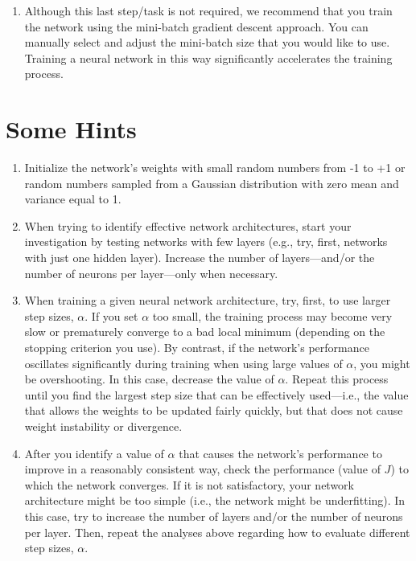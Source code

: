 \documentclass[letterpaper]{article}
\begin{document}
\begin{enumerate}
    \item Although this last step/task is not required, we recommend that you train the network using the mini-batch gradient descent approach. You can manually select and adjust the mini-batch size that you would like to use. Training a neural network in this way significantly accelerates the training process.
    
\end{enumerate}

\section{Some Hints}

\begin{enumerate}
    \item Initialize the network's weights with small random numbers from -1 to +1 or random numbers sampled from a Gaussian distribution with zero mean and variance equal to 1.
    \item When trying to identify effective network architectures, start your investigation by testing networks with few layers (e.g., try, first, networks with just one hidden layer). Increase the number of layers---and/or the number of neurons per layer---only when necessary.
    \item When training a given neural network architecture, try, first, to use larger step sizes, $\alpha$. If you set $\alpha$ too small, the training process may become very slow or prematurely converge to a bad local minimum (depending on the stopping criterion you use). By contrast, if the network's performance oscillates significantly during training when using large values of $\alpha$, you might be overshooting. In this case, decrease the value of $\alpha$. Repeat this process until you find the largest step size that can be effectively used---i.e., the value that allows the weights to be updated fairly quickly, but that does not cause weight instability or divergence.
    \item After you identify a value of $\alpha$ that causes the network's performance to improve in a reasonably consistent way, check the performance (value of $J$) to which the network converges. If it is not satisfactory, your network architecture might be too simple (i.e., the network might be underfitting). In this case, try to increase the number of layers and/or the number of neurons per layer. Then, repeat the analyses above regarding how to evaluate different step sizes, $\alpha$.

\end{enumerate}
\end{document}
